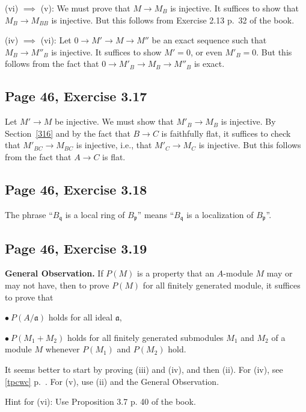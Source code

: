 \documentclass[parskip=half,fontsize=12pt]{scrartcl}%
\newcommand{\oo}{\operatorname}\newcommand{\ooo}{\operatorname*}
\newcommand{\mf}{\mathfrak}
\newcommand{\aaa}{\mf a}
\newcommand{\ppp}{\mf p}
\newcommand{\qqq}{\mf q}
\newcommand{\Ann}{\oo{Ann}}
\newcommand{\bu}{\bullet}
\begin{document}
(vi) $\implies$ (v): We must prove that $M\to M_B$ is injective. It suffices to show that $M_B\to M_{BB}$ is injective. But this follows from Exercise 2.13 p.~32 of the book.

(iv) $\implies$ (vi): Let $0\to M'\to M\to M''$ be an exact sequence such that $M_B\to M''_B$ is injective. It suffices to show $M'=0$, or even $M'_B=0$. But this follows from the fact that $0\to M'_B\to M_B\to M''_B$ is exact.

\subsection{Page 46, Exercise 3.17}%

Let $M'\to M$ be injective. We must show that $M'_B\to M_B$ is injective.  By Section~\ref{316} and by the fact that $B\to C$ is faithfully flat, it suffices to check that $M'_{BC}\to M_{BC}$ is injective, i.e., that $M'_C\to M_C$ is injective. But this follows from the fact that $A\to C$ is flat.

\subsection{Page 46, Exercise 3.18}%

The phrase ``$B_\qqq$ is a local ring of $B_\ppp$'' means ``$B_\qqq$ is a localization of $B_\ppp$''.

\subsection{Page 46, Exercise 3.19}%

\textbf{General Observation.} If $P(M)$ is a property that an $A$-module $M$ may or may not have, then to prove $P(M)$ for all finitely generated module, it suffices to prove that 

$\bu\ P(A/\aaa)$ holds for all ideal $\aaa$,

$\bu\ P(M_1+M_2)$ holds for all finitely generated submodules $M_1$ and $M_2$ of a module $M$ whenever $P(M_1)$ and $P(M_2)$ hold.

It seems better to start by proving (iii) and (iv), and then (ii). For (iv), see \eqref{tpcwc} p.~\pageref{tpcwc}. For (v), use (ii) and the General Observation. 

Hint for (vi): Use Proposition 3.7 p. 40 of the book.

\end{document}
